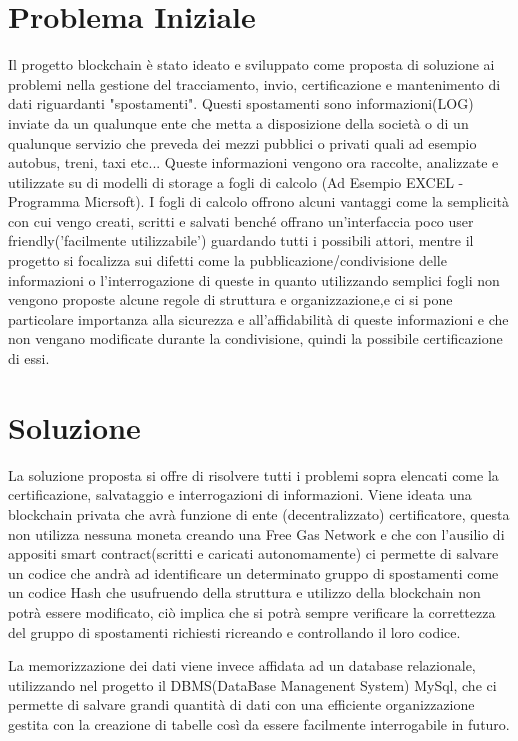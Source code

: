\documentclass[a4paper]{report}
\begin{document}
\section{Problema Iniziale}
Il progetto blockchain è stato ideato e sviluppato come proposta di soluzione ai problemi nella gestione del tracciamento, invio, certificazione e mantenimento di dati riguardanti "spostamenti". Questi spostamenti sono informazioni(LOG) inviate da un qualunque ente che metta a disposizione della società o di un qualunque servizio che preveda dei mezzi pubblici o privati quali ad esempio autobus, treni, taxi etc... Queste informazioni vengono ora raccolte, analizzate e utilizzate su di modelli di storage a fogli di calcolo (Ad Esempio EXCEL - Programma Micrsoft). I fogli di calcolo offrono alcuni vantaggi come la semplicità con cui vengo creati, scritti e salvati benché offrano un'interfaccia poco user friendly('facilmente utilizzabile') guardando tutti i possibili attori, mentre il progetto si focalizza sui difetti come la pubblicazione/condivisione delle informazioni o l'interrogazione di queste in quanto utilizzando semplici fogli non vengono proposte alcune regole di struttura e organizzazione,e ci si pone particolare importanza alla sicurezza e all'affidabilità di queste informazioni e che non vengano modificate durante la condivisione, quindi la possibile certificazione di essi.

\section{Soluzione}
La soluzione proposta si offre di risolvere tutti i problemi sopra elencati come la certificazione, salvataggio e interrogazioni di informazioni. Viene ideata una blockchain privata che avrà funzione di ente (decentralizzato) certificatore, questa non utilizza nessuna moneta creando una Free Gas Network e che con l'ausilio di appositi smart contract(scritti e caricati autonomamente) ci permette di salvare un codice che andrà ad identificare un determinato gruppo di spostamenti come un codice Hash che usufruendo della struttura e utilizzo della blockchain non potrà essere modificato, ciò implica che si potrà sempre verificare la correttezza del gruppo di spostamenti richiesti ricreando e controllando il loro codice.

La memorizzazione dei dati viene invece affidata ad un database relazionale, utilizzando nel progetto il DBMS(DataBase Managenent System) MySql, che ci permette di salvare grandi quantità di dati con una efficiente organizzazione gestita con la creazione di tabelle così da essere facilmente interrogabile in futuro.
 
\end{document}
